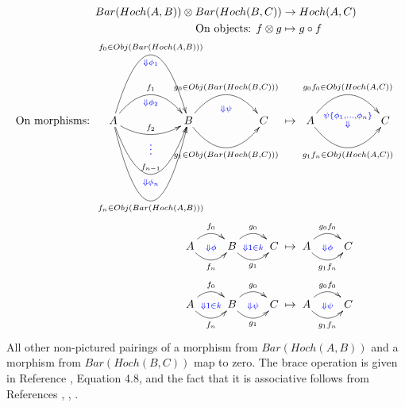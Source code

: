 \begin{align*}
Bar(Hoch(A,B)) \otimes 
Bar(Hoch(B,C)) 
&\to 
Hoch(A,C)\\
%
\textrm{On objects: } f \otimes g
&\mapsto 
g \circ f\\
%
\textrm{On morphisms: }
\xymatrix{
	A 
	\ar@/^5pc/[rr]^{f_0 \in Obj(Bar(Hoch(A,B)))}_{\substack{\\\textcolor{blue}{\Downarrow \phi_1}}}
	\ar@/^2pc/[rr]^{f_1}_{\substack{\\\textcolor{blue}{\Downarrow \phi_2}}}
	\ar@/_1pc/[rr]^{f_2}_{\textcolor{blue}{\vdots}}
	\ar@/_4pc/[rr]^{f_{n-1}}_{\substack{\\\textcolor{blue}{\Downarrow \phi_n}}}
	\ar@/_6pc/[rr]_{f_n \in Obj(Bar(Hoch(A,B)))} 
	&&	B 
	\ar@/^2pc/[rr]^{g_0 \in Obj(Bar(Hoch(B,C)))}_{\substack{\\\\\textcolor{blue}{\Downarrow \psi}}}
	\ar@/_2pc/[rr]_{g_1\in Obj(Bar(Hoch(B,C)))} 
	&& C 
}
&\mapsto
\xymatrix{
	A
	\ar@/^2pc/[rr]^{g_0f_0 \in Obj(Hoch(A,C))}_{\substack{\\\\\\ \textcolor{blue}{\psi\{\phi_1, \dots, \phi_n\}}\\ \textcolor{blue}{\Downarrow}}}
	\ar@/_2pc/[rr]_{g_1f_n \in Obj(Hoch(A,C))}
	&& C
}\\
%
\xymatrix{
	A 
	\ar@/^1pc/[r]^{f_0}_{\substack{\\\\\textcolor{blue}{\Downarrow \phi}}}
	\ar@/_1pc/[r]_{f_n} 
	&	B 
	\ar@/^1pc/[r]^{g_0}_{\substack{\\\\\textcolor{blue}{\Downarrow 1 \in k}}}
	\ar@/_1pc/[r]_{g_1} 
	& C}
&\mapsto	
\xymatrix{
	A
	\ar@/^1pc/[r]^{g_0f_0}_{\substack{\\\\ \textcolor{blue}{\Downarrow \phi}}}
	\ar@/_1pc/[r]_{g_1f_n}
	& C
}\\ 
%
\xymatrix{
	A 
	\ar@/^1pc/[r]^{f_0}_{\substack{\\\\\textcolor{blue}{\Downarrow 1 \in k}}}
	\ar@/_1pc/[r]_{f_n} 
	&	B 
	\ar@/^1pc/[r]^{g_0}_{\substack{\\\\\textcolor{blue}{\Downarrow \psi}}}
	\ar@/_1pc/[r]_{g_1} 
	& 	C}
&\mapsto
\xymatrix{
	A
	\ar@/^1pc/[r]^{g_0f_0}_{\substack{\\\\ \textcolor{blue}{\Downarrow \psi}}}
	\ar@/_1pc/[r]_{g_1f_n}
	& C
}
\end{align*}
All other non-pictured pairings of a morphism from 
$Bar(Hoch(A,B))$ and a morphism from $Bar(Hoch(B,C))$ 
map to zero. The brace operation is given in Reference 
\cite{T}, Equation 4.8, and the fact that it is 
associative follows from References \cite{GJ}, \cite{GV}, \cite{Ka}.
